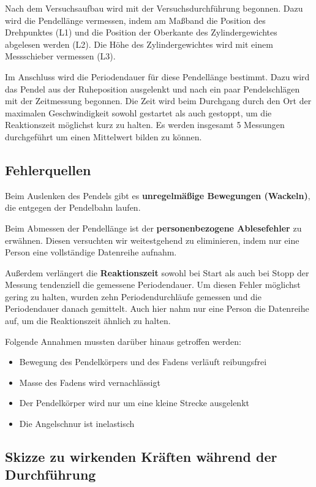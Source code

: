 \documentclass[
  9pt,
]{article}
\providecommand{\tightlist}{%
  \setlength{\itemsep}{0pt}\setlength{\parskip}{0pt}}
\begin{document}
Nach dem Versuchsaufbau wird mit der Versuchsdurchführung begonnen. Dazu
wird die Pendellänge vermessen, indem am Maßband die Position des
Drehpunktes (L1) und die Position der Oberkante des Zylindergewichtes
abgelesen werden (L2). Die Höhe des Zylindergewichtes wird mit einem
Messschieber vermessen (L3).

Im Anschluss wird die Periodendauer für diese Pendellänge bestimmt. Dazu
wird das Pendel aus der Ruheposition ausgelenkt und nach ein paar
Pendelschlägen mit der Zeitmessung begonnen. Die Zeit wird beim
Durchgang durch den Ort der maximalen Geschwindigkeit sowohl gestartet
als auch gestoppt, um die Reaktionszeit möglichst kurz zu halten. Es
werden insgesamt 5 Messungen durchgeführt um einen Mittelwert bilden zu
können.

\hypertarget{fehlerquellen}{%
\subsection{Fehlerquellen}\label{fehlerquellen}}

Beim Auslenken des Pendels gibt es \textbf{unregelmäßige Bewegungen
(Wackeln)}, die entgegen der Pendelbahn laufen.

Beim Abmessen der Pendellänge ist der \textbf{personenbezogene
Ablesefehler} zu erwähnen. Diesen versuchten wir weitestgehend zu
eliminieren, indem nur eine Person eine vollständige Datenreihe aufnahm.

Außerdem verlängert die \textbf{Reaktionszeit} sowohl bei Start als auch
bei Stopp der Messung tendenziell die gemessene Periodendauer. Um diesen
Fehler möglichst gering zu halten, wurden zehn Periodendurchläufe
gemessen und die Periodendauer danach gemittelt. Auch hier nahm nur eine
Person die Datenreihe auf, um die Reaktionszeit ähnlich zu halten.

Folgende Annahmen mussten darüber hinaus getroffen werden:

\begin{itemize}
\tightlist
\item
  Bewegung des Pendelkörpers und des Fadens verläuft reibungsfrei
\item
  Masse des Fadens wird vernachlässigt
\item
  Der Pendelkörper wird nur um eine kleine Strecke ausgelenkt
\item
  Die Angelschnur ist inelastisch
\end{itemize}

\hypertarget{skizze-zu-wirkenden-kruxe4ften-wuxe4hrend-der-durchfuxfchrung}{%
\subsection{Skizze zu wirkenden Kräften während der
Durchführung}\label{skizze-zu-wirkenden-kruxe4ften-wuxe4hrend-der-durchfuxfchrung}}
\end{document}
